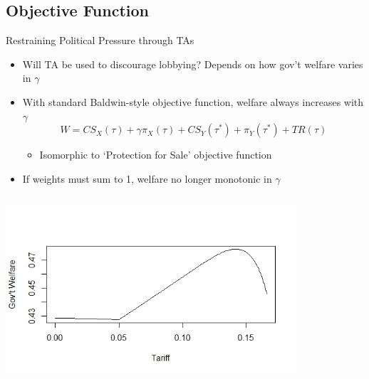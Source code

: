 \documentclass[handout]{beamer}
\newcommand{\ga}{\gamma}
\begin{document}
\subsection{Objective Function}
\begin{frame}{Restraining Political Pressure through TAs}
\pause
\begin{itemize}[<+->]
	\item Will TA be used to discourage lobbying? Depends on how gov't welfare varies in $\ga$
	\item With standard Baldwin-style objective function, welfare always increases with $\ga$
\[
  W = \mathit{CS}_X(\tau) + \ga \pi_X(\tau) + \mathit{CS}_Y(\tau^*) + \pi_Y(\tau^*) + \mathit{TR}(\tau)
\] 

	\begin{itemize}
		\item Isomorphic to `Protection for Sale' objective function
	\end{itemize}

	\item If weights must sum to 1, welfare no longer monotonic in $\ga$
\end{itemize}
\end{frame}

\begin{frame}
\includegraphics[height=2.75in, width=4.25in]{weight.jpeg}
\end{frame}
\end{document}
